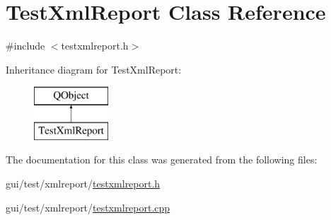 \hypertarget{class_test_xml_report}{\section{Test\-Xml\-Report Class Reference}
\label{class_test_xml_report}
}


{\ttfamily \#include $<$testxmlreport.\-h$>$}

Inheritance diagram for Test\-Xml\-Report\-:\begin{figure}[H]
\begin{center}
\leavevmode
\includegraphics[height=2.000000cm]{class_test_xml_report}
\end{center}
\end{figure}


The documentation for this class was generated from the following files\-:\begin{DoxyCompactItemize}
\item 
gui/test/xmlreport/\hyperlink{testxmlreport_8h}{testxmlreport.\-h}\item 
gui/test/xmlreport/\hyperlink{testxmlreport_8cpp}{testxmlreport.\-cpp}\end{DoxyCompactItemize}
